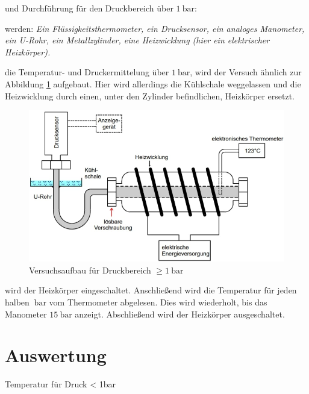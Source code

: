 \justifying und Durchführung für den Druckbereich über $\SI{1}{\bar}$:

\justifying werden: \textit{Ein Flüssigkeitsthermometer, ein Drucksensor, ein analoges Manometer, ein U-Rohr, ein Metallzylinder, eine Heizwicklung 
(hier ein elektrischer Heizkörper).}

\justifying die Temperatur- und Druckermittelung über $\SI{1}{\bar}$, wird der Versuch ähnlich zur Abbildung \ref{fig:2} aufgebaut. 
Hier wird allerdings die Kühlschale weggelassen und die Heizwicklung durch einen, unter den Zylinder befindlichen, Heizkörper ersetzt. 

\begin{figure}
    \centering
    \includegraphics[width=\linewidth]{./images/g1bar.jpg}
    \caption{Versuchsaufbau für Druckbereich $\geq \SI{1}{\bar}$ \cite{V203}}
    \label{fig:2}
\end{figure}

\justifying wird der Heizkörper eingeschaltet. Anschließend wird die Temperatur für jeden halben $\SI{}{\bar}$ vom Thermometer
abgelesen. Dies wird wiederholt, bis das Manometer $\SI{15}{\bar}$ anzeigt. Abschließend wird der Heizkörper ausgeschaltet.


\section{Auswertung}

\begin{table}
    \centering
    
    \caption{Temperatur für Druck < 1bar}
    \label{tab:1}
\end{table}

